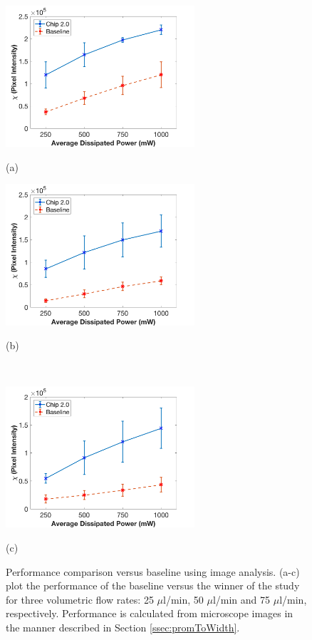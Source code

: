 \begin{figure}[H]
  \begin{minipage}[t]{0.49\linewidth}\centering
    \includegraphics[width=7cm]{ErrorBars25ul}
    \medskip
    \centerline{(a)}
  \end{minipage}\hfill
  \begin{minipage}[t]{0.49\linewidth}\centering
    \includegraphics[width=7cm]{ErrorBars50ul}
    \medskip
    \centerline{(b)}\\
  \end{minipage}
  \begin{minipage}[t]{0.99\linewidth}\centering
    \includegraphics[width=7cm]{ErrorBars75ul}
    \medskip
    \centerline{(c)}
  \end{minipage}
  \caption[Performance Comparison Versus Baseline using Image Analysis]{Performance comparison versus baseline using image analysis. (a-c) plot the performance of the baseline versus the winner of the study for three volumetric flow rates: 25 $\mu$l/min, 50 $\mu$l/min and 75 $\mu$l/min, respectively. Performance is calculated from microscope images in the manner described in Section \ref{ssec:promToWidth}.}
	\label{fig:headToHeadImages}
\end{figure}


